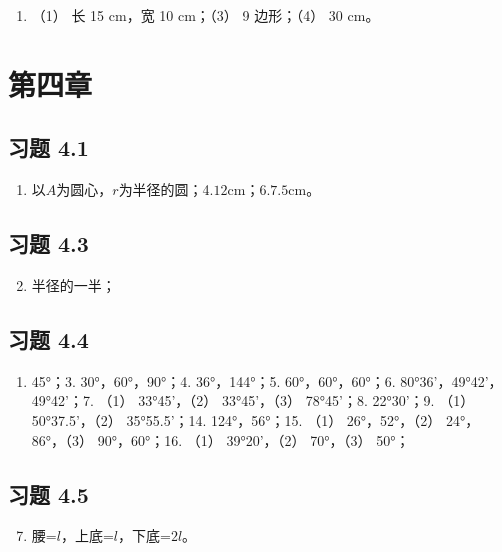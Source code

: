 \begin{enumerate}
\item
  （1） 长 15 cm，宽 10 cm；（3） 9 边形；（4） 30 cm。
\end{enumerate}

\section{第四章}

\subsection{习题 4.1}

\begin{enumerate}
\item
  以\(A\)为圆心，\(r\)为半径的圆；4.\(12\mathrm{cm}\)；6.\(7.5\mathrm{cm}\)。
\end{enumerate}

\subsection{习题 4.3}

\begin{enumerate}
\setcounter{enumi}{1}
\item
  半径的一半；
\end{enumerate}

\subsection{习题 4.4}

\begin{enumerate}
\item
  45°；3. 30°，60°，90°；4. 36°，144°；5. 60°，60°，60°；6.
  80°36'，49°42'，49°42'；7. （1） 33°45'，（2） 33°45'，（3）
  78°45'；8. 22°30'；9. （1） 50°37.5'，（2） 35°55.5'；14.
  124°，56°；15. （1） 26°，52°，（2） 24°，86°，（3） 90°，60°；16.
  （1） 39°20'，（2） 70°，（3） 50°；
\end{enumerate}

\subsection{习题 4.5}

\begin{enumerate}
\setcounter{enumi}{6}
\item
  腰=\(l\)，上底=\(l\)，下底=\(2l\)。
\end{enumerate}

